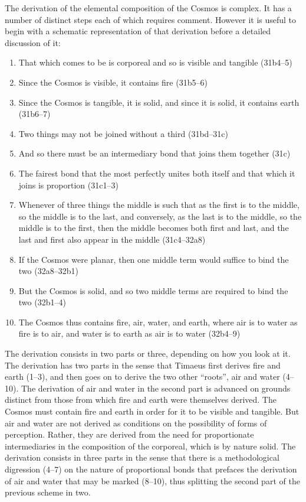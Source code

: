 The derivation of the elemental composition of the Cosmos is complex. It has a number of distinct steps each of which requires comment. However it is useful to begin with a schematic representation of that derivation before a detailed discussion of it:
\begin{enumerate}[(1)]
	\item That which comes to be is corporeal and so is visible and tangible (31b4--5)
	\item Since the Cosmos is visible, it contains fire (31b5--6)
	\item Since the Cosmos is tangible, it is solid, and since it is solid, it contains earth (31b6--7)
	\item Two things may not be joined without a third (31bd--31c)
	\item And so there must be an intermediary bond that joins them together (31c)
	\item The fairest bond that the most perfectly unites both itself and that which it joins is proportion (31c1--3)
	\item Whenever of three things the middle is such that as the first is to the middle, so the middle is to the last, and conversely, as the last is to the middle, so the middle is to the first, then the middle becomes both first and last, and the last and first also appear in the middle (31c4--32a8)
	\item If the Cosmos were planar, then one middle term would suffice to bind the two (32a8--32b1)
	\item But the Cosmos is solid, and so two middle terms are required to bind the two (32b1--4)
	\item The Cosmos thus contains fire, air, water, and earth, where air is to water as fire is to air, and water is to earth as air is to water (32b4--9)
\end{enumerate}
The derivation consists in two parts or three, depending on how you look at it. The derivation has two parts in the sense that Timaeus first derives fire and earth (1--3), and then goes on to derive the two other ``roots'', air and water (4--10). The derivation of air and water in the second part is advanced on grounds distinct from those from which fire and earth were themselves derived. The Cosmos must contain fire and earth in order for it to be visible and tangible. But air and water are not derived as conditions on the possibility of forms of perception. Rather, they are derived from the need for proportionate intermediaries in the composition of the corporeal, which is by nature solid. The derivation consists in three parts in the sense that there is a methodological digression (4--7) on the nature of proportional bonds that prefaces the derivation of air and water that may be marked (8--10), thus splitting the second part of the previous scheme in two.

